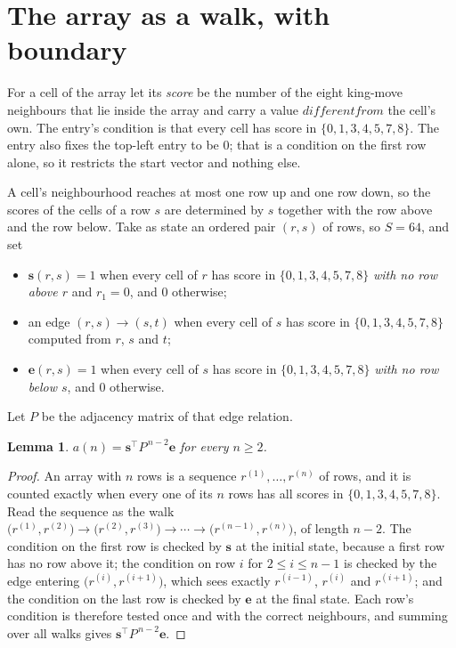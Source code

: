 \documentclass[11pt,a4paper]{article}
\theoremstyle{plain}
\newtheorem{lemma}[theorem]{Lemma}
\theoremstyle{definition}
\begin{document}
\section{The array as a walk, with boundary}

For a cell of the array let its \emph{score} be the number of the eight king-move neighbours that lie inside
the array and carry a value $different from$ the cell's own. The entry's condition is that every cell
has score in $\{0,1,3,4,5,7,8\}$. The entry also fixes the top-left entry to be $0$; that is a condition on the first row alone, so it restricts the start vector and nothing else.

A cell's neighbourhood reaches at most one row up and one row down, so the scores of the
cells of a row $s$ are determined by $s$ together with the row above and the row below.
Take as state an ordered pair $(r,s)$ of rows, so $S=64$, and set
\begin{itemize}
\item $\mathbf{s}(r,s)=1$ when every cell of $r$ has score in $\{0,1,3,4,5,7,8\}$ \emph{with no row
above $r$} and $r_1=0$, and $0$ otherwise;
\item an edge $(r,s)\to(s,t)$ when every cell of $s$ has score in $\{0,1,3,4,5,7,8\}$ computed from
$r$, $s$ and $t$;
\item $\mathbf{e}(r,s)=1$ when every cell of $s$ has score in $\{0,1,3,4,5,7,8\}$ \emph{with no row
below $s$}, and $0$ otherwise.
\end{itemize}
Let $P$ be the adjacency matrix of that edge relation.

\begin{lemma}\label{lem:walk}
$a(n)=\mathbf{s}^{\!\top}P^{\,n-2}\mathbf{e}$ for every $n\ge2$.
\end{lemma}

\begin{proof}
An array with $n$ rows is a sequence $r^{(1)},\dots,r^{(n)}$ of rows, and it is counted
exactly when every one of its $n$ rows has all scores in $\{0,1,3,4,5,7,8\}$. Read the sequence as the
walk $\bigl(r^{(1)},r^{(2)}\bigr)\to\bigl(r^{(2)},r^{(3)}\bigr)\to\cdots\to
\bigl(r^{(n-1)},r^{(n)}\bigr)$, of length $n-2$. The condition on the first row is
checked by $\mathbf{s}$ at the initial state, because a first row has no row above it; the
condition on row $i$ for $2\le i\le n-1$ is checked by the edge entering
$\bigl(r^{(i)},r^{(i+1)}\bigr)$, which sees exactly $r^{(i-1)}$, $r^{(i)}$ and
$r^{(i+1)}$; and the condition on the last row is checked by $\mathbf{e}$ at the final
state. Each row's condition is therefore tested once and with the correct neighbours, and
summing over all walks gives $\mathbf{s}^{\!\top}P^{\,n-2}\mathbf{e}$.
\end{proof}
\end{document}
